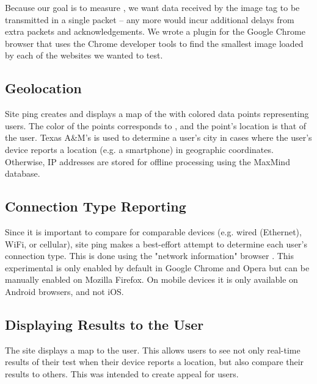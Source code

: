 Because our goal is to measure \rtt, we want data received by the image tag to be transmitted in a single packet -- any more would incur additional delays from extra \tcp packets and acknowledgements. We wrote a plugin for the Google Chrome browser that uses the Chrome developer tools \api to find the smallest image loaded by each of the websites we wanted to test.

\subsection{Geolocation}
Site ping creates and displays a map of the \us with colored data points representing users. The color of the points corresponds to \rtt, and the point's location is that of the user. Texas A\&M's \api is used to determine a user's city in cases where the user's device reports a location (e.g. a smartphone) in geographic coordinates. Otherwise, IP addresses are stored for offline processing using the MaxMind database.

\subsection{Connection Type Reporting}
Since it is important to compare \rtts for comparable devices (e.g. wired (Ethernet), WiFi, or cellular), site ping makes a best-effort attempt to determine each user's connection type. This is done using the "network information" browser \api. This experimental \api is only enabled by default in Google Chrome and Opera but can be manually enabled on Mozilla Firefox. On mobile devices it is only available on Android browsers, and not iOS.

\subsection{Displaying Results to the User}
The site displays a map to the user. This allows users to see not only real-time results of their test when their device reports a location, but also compare their results to others. This was intended to create appeal for users.